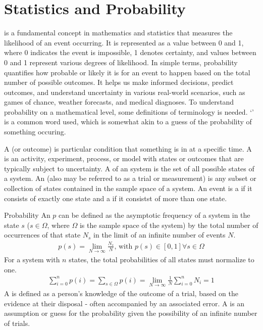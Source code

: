 \chapter{Statistics and Probability}
\thispagestyle{fancy}

 is a fundamental concept in mathematics and statistics that measures the likelihood of an event occurring. It is represented as a value between 0 and 1, where 0 indicates the event is impossible, 1 denotes certainty, and values between 0 and 1 represent various degrees of likelihood. In simple terms, probability quantifies how probable or likely it is for an event to happen based on the total number of possible outcomes. It helps us make informed decisions, predict outcomes, and understand uncertainty in various real-world scenarios, such as games of chance, weather forecasts, and medical diagnoses. To understand probability on a mathematical level, some definitions of terminology is needed. `' is a common word used, which is somewhat akin to a guess of the probability of something occuring.

A  (or outcome) is particular condition that something is in at a specific time. A  is an activity, experiment, process, or model with states or outcomes that are typically subject to uncertainty. A  of an system is the set of all possible states of a system. An  (also may be referred to as a trial or measurement) is any subset or collection of states contained in the sample space of a system. An event is a  if it consists of exactly one state and a  if it consistst of more than one state.

\begin{defn}[Probability]{Probability}
An  $p$ can be defined as the asymptotic frequency of a system in the state $s$ ($s \in \Omega$, where $\Omega$ is the sample space of the system) by the total number of occurrences of that state $N_s$ in the limit of an infinite number of events $N$.
    \begin{align}
        p(s) = \lim_{N\rightarrow\infty}\frac{N_s}{N} \text{, with } p(s) \in [0,1] \forall s \in \Omega
    \end{align}
For a system with $n$ states, the total probabilities of all states must normalize to one.
    \begin{align}
        \sum_{i=0}^{n}p(i) = \sum_{s \in \Omega}p(i) = \lim_{N\rightarrow\infty}\frac{1}{N}\sum_{i=0}^{n}N_i = 1
    \end{align}
A  is defined as a person's knowledge of the outcome of a trial, based on the evidence at their disposal - often accompanied by an associated error. A  is an assumption or guess for the probability given the possibility of an infinite number of trials.
\end{defn}

